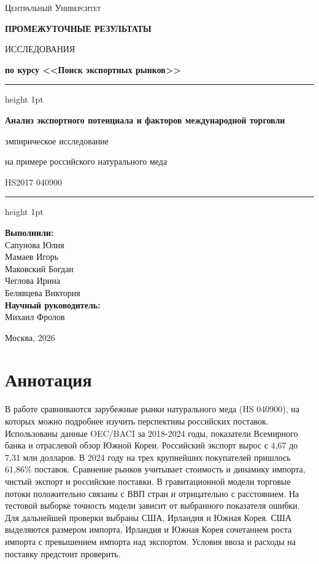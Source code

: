 \documentclass[12pt,a4paper]{article}
\newcommand{\authors}{Сапунова Юлия\\Мамаев Игорь\\Маковский Богдан\\Чеглова Ирина\\Белявцева Виктория}
\begin{document}
\raggedbottom
\hypersetup{pageanchor=false}
\begin{titlepage}
\centering
{\large\textsc{Центральный Университет}\par}
\vspace{1.8cm}
{\Large\bfseries ПРОМЕЖУТОЧНЫЕ РЕЗУЛЬТАТЫ\par ИССЛЕДОВАНИЯ\par}
\vspace{0.5cm}
{\large\bfseries по курсу <<Поиск экспортных рынков>>\par}
\vspace{1.6cm}
\hrule height 1pt
\vspace{0.4cm}
{\LARGE\bfseries Анализ экспортного потенциала и факторов международной торговли\par}
\vspace{0.3cm}
{\Large эмпирическое исследование\par на примере российского натурального меда\par HS2017 040900\par}
\vspace{0.4cm}
\hrule height 1pt
\vspace{1.4cm}
\hfill\begin{minipage}{0.45\textwidth}
\textbf{Выполнили:}\\
\authors\\[0.7cm]
\textbf{Научный руководитель:}\\
Михаил Фролов
\end{minipage}
\vfill
Москва, 2026
\end{titlepage}
\hypersetup{pageanchor=true}
\begingroup
\small
\setlength{\parskip}{0pt}
\tableofcontents
\endgroup
\clearpage
\section*{Аннотация}
В работе сравниваются зарубежные рынки натурального меда (HS 040900), на которых можно подробнее изучить перспективы российских поставок. Использованы данные OEC/BACI за 2018-2024 годы, показатели Всемирного банка и отраслевой обзор Южной Кореи. Российский экспорт вырос с 4,67 до 7,31 млн долларов. В 2024 году на трех крупнейших покупателей пришлось 61,86\% поставок. Сравнение рынков учитывает стоимость и динамику импорта, чистый экспорт и российские поставки. В гравитационной модели торговые потоки положительно связаны с ВВП стран и отрицательно с расстоянием. На тестовой выборке точность модели зависит от выбранного показателя ошибки. Для дальнейшей проверки выбраны США, Ирландия и Южная Корея. США выделяются размером импорта, Ирландия и Южная Корея сочетанием роста импорта с превышением импорта над экспортом. Условия ввоза и расходы на поставку предстоит проверить.
\end{document}
